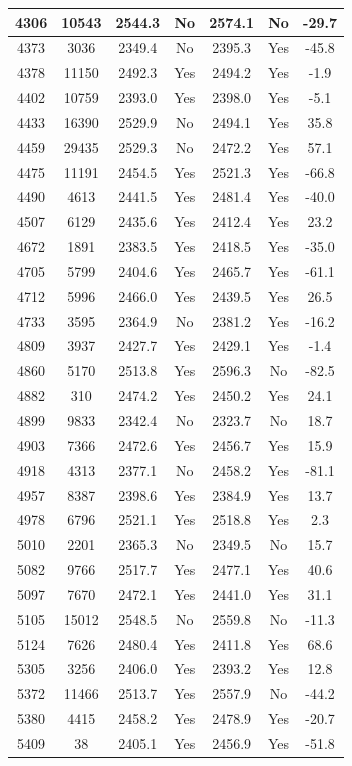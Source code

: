 \begin{center}
\begin{longtable}{|c|c|c|c|c|c|c|}
\hline 4306 & 10543 & 2544.3 & No & 2574.1 & No & -29.7 \\
\hline 4373 & 3036 & 2349.4 & No & 2395.3 & Yes & -45.8 \\
\hline 4378 & 11150 & 2492.3 & Yes & 2494.2 & Yes & -1.9 \\
\hline 4402 & 10759 & 2393.0 & Yes & 2398.0 & Yes & -5.1 \\
\hline 4433 & 16390 & 2529.9 & No & 2494.1 & Yes & 35.8 \\
\hline 4459 & 29435 & 2529.3 & No & 2472.2 & Yes & 57.1 \\
\hline 4475 & 11191 & 2454.5 & Yes & 2521.3 & Yes & -66.8 \\
\hline 4490 & 4613 & 2441.5 & Yes & 2481.4 & Yes & -40.0 \\
\hline 4507 & 6129 & 2435.6 & Yes & 2412.4 & Yes & 23.2 \\
\hline 4672 & 1891 & 2383.5 & Yes & 2418.5 & Yes & -35.0 \\
\hline 4705 & 5799 & 2404.6 & Yes & 2465.7 & Yes & -61.1 \\
\hline 4712 & 5996 & 2466.0 & Yes & 2439.5 & Yes & 26.5 \\
\hline 4733 & 3595 & 2364.9 & No & 2381.2 & Yes & -16.2 \\
\hline 4809 & 3937 & 2427.7 & Yes & 2429.1 & Yes & -1.4 \\
\hline 4860 & 5170 & 2513.8 & Yes & 2596.3 & No & -82.5 \\
\hline 4882 & 310 & 2474.2 & Yes & 2450.2 & Yes & 24.1 \\
\hline 4899 & 9833 & 2342.4 & No & 2323.7 & No & 18.7 \\
\hline 4903 & 7366 & 2472.6 & Yes & 2456.7 & Yes & 15.9 \\
\hline 4918 & 4313 & 2377.1 & No & 2458.2 & Yes & -81.1 \\
\hline 4957 & 8387 & 2398.6 & Yes & 2384.9 & Yes & 13.7 \\
\hline 4978 & 6796 & 2521.1 & Yes & 2518.8 & Yes & 2.3 \\
\hline 5010 & 2201 & 2365.3 & No & 2349.5 & No & 15.7 \\
\hline 5082 & 9766 & 2517.7 & Yes & 2477.1 & Yes & 40.6 \\
\hline 5097 & 7670 & 2472.1 & Yes & 2441.0 & Yes & 31.1 \\
\hline 5105 & 15012 & 2548.5 & No & 2559.8 & No & -11.3 \\
\hline 5124 & 7626 & 2480.4 & Yes & 2411.8 & Yes & 68.6 \\
\hline 5305 & 3256 & 2406.0 & Yes & 2393.2 & Yes & 12.8 \\
\hline 5372 & 11466 & 2513.7 & Yes & 2557.9 & No & -44.2 \\
\hline 5380 & 4415 & 2458.2 & Yes & 2478.9 & Yes & -20.7 \\
\hline 5409 & 38 & 2405.1 & Yes & 2456.9 & Yes & -51.8 \\
\end{longtable}
\end{center}



